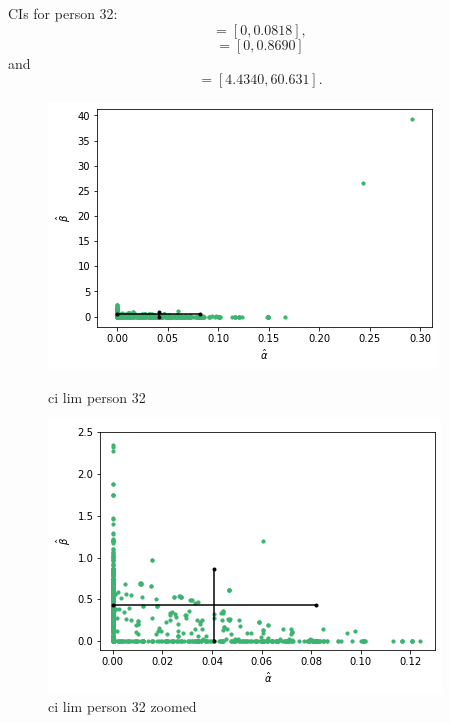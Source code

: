 CIs for person 32:
\begin{equation*}
    [\hat{\alpha}^{*(5)}_{1000},\hat{\alpha}^{*(95)}_{1000}] = [0,0.0818],
\end{equation*}
\begin{equation*}
    [\hb^{*(5)}_{1000},\hb^{*(95)}_{1000}] = [0,0.8690]
\end{equation*}
and
\begin{equation*}
    [\hat{\eta}^{*(5)}_{1000},\hat{\eta}^{*(95)}_{1000}] = [4.4340,60.631].
\end{equation*}

\begin{figure}
    \centering
    \begin{minipage}{0.48\textwidth}
        \centering
        \includegraphics[scale=0.37]{pictures/ci_lim_a_b_person32.png}
        \caption{ci lim person 32}
        \label{fig:ci_lim_a_b_person_32}
    \end{minipage}\hfill
    \begin{minipage}{0.48\textwidth}
        \centering
        \includegraphics[scale=0.37]{pictures/ci_lim_a_b_person32_zoomed.png}
        \caption{ci lim person 32 zoomed}
        \label{fig:ci_lim_a_b_person_32_zoomed}
    \end{minipage}
\end{figure}

